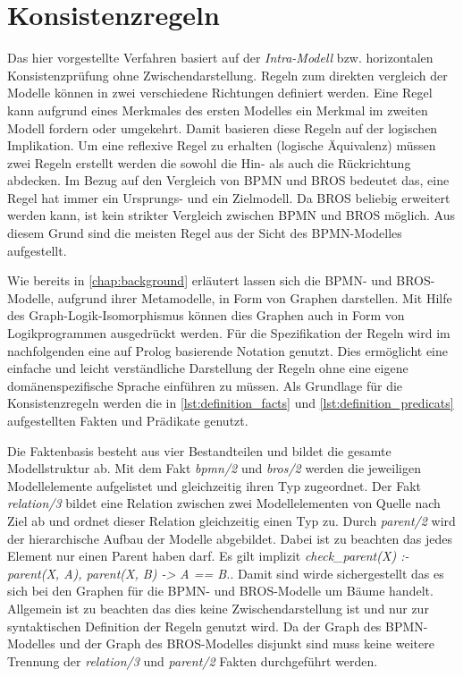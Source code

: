\section{Konsistenzregeln} \label{sec:Konsistenzregeln}

Das hier vorgestellte Verfahren basiert auf der \emph{Intra-Modell} bzw. horizontalen Konsistenzprüfung ohne Zwischendarstellung.
Regeln zum direkten vergleich der Modelle können in zwei verschiedene Richtungen definiert werden.
Eine Regel kann aufgrund eines Merkmales des ersten Modelles ein Merkmal im zweiten Modell fordern oder umgekehrt.
Damit basieren diese Regeln auf der logischen Implikation.
Um eine reflexive Regel zu erhalten (logische Äquivalenz) müssen zwei Regeln erstellt werden die sowohl die Hin- als auch die Rückrichtung abdecken.
Im Bezug auf den Vergleich von BPMN und BROS bedeutet das, eine Regel hat immer ein Ursprungs- und ein Zielmodell.
Da BROS beliebig erweitert werden kann, ist kein strikter Vergleich zwischen BPMN und BROS möglich.
Aus diesem Grund sind die meisten Regel aus der Sicht des BPMN-Modelles aufgestellt.

Wie bereits in \cref{chap:background} erläutert lassen sich die BPMN- und BROS-Modelle, aufgrund ihrer Metamodelle, in Form von Graphen darstellen.
Mit Hilfe des Graph-Logik-Isomorphismus können dies Graphen auch in Form von Logikprogrammen ausgedrückt werden.
Für die Spezifikation der Regeln wird im nachfolgenden eine auf Prolog basierende Notation genutzt.
Dies ermöglicht eine einfache und leicht verständliche Darstellung der Regeln ohne eine eigene domänenspezifische Sprache einführen zu müssen.
Als Grundlage für die Konsistenzregeln werden die in \cref{lst:definition_facts} und \cref{lst:definition_predicats} aufgestellten Fakten und Prädikate genutzt.

Die Faktenbasis besteht aus vier Bestandteilen und bildet die gesamte Modellstruktur ab.
Mit dem Fakt \emph{bpmn/2} und \emph{bros/2} werden die jeweiligen Modellelemente aufgelistet und gleichzeitig ihren Typ zugeordnet.
Der Fakt \emph{relation/3} bildet eine Relation zwischen zwei Modellelementen von Quelle nach Ziel ab und ordnet dieser Relation gleichzeitig einen Typ zu.
Durch \emph{parent/2} wird der hierarchische Aufbau der Modelle abgebildet.
Dabei ist zu beachten das jedes Element nur einen Parent haben darf.
Es gilt implizit \emph{check\_parent(X) :- parent(X, A), parent(X, B) -> A == B.}.
Damit sind wirde sichergestellt das es sich bei den Graphen für die BPMN- und BROS-Modelle um Bäume handelt.
Allgemein ist zu beachten das dies keine Zwischendarstellung ist und nur zur syntaktischen Definition der Regeln genutzt wird.
Da der Graph des BPMN-Modelles und der Graph des BROS-Modelles disjunkt sind muss keine weitere Trennung der \emph{relation/3} und \emph{parent/2} Fakten durchgeführt werden.

